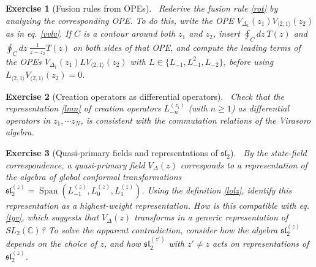 \documentclass[12pt, a4paper, notitlepage, twoside]{report}
\numberwithin{equation}{section}
\theoremstyle{break}
\newtheorem{exo}{Exercise}[chapter]
\begin{document}
\begin{exo}[Fusion rules from OPEs]
 ~\label{exooit}
Rederive the fusion rule \eqref{rot} by analyzing the corresponding OPE.
To do this, write the OPE $V_{\Delta_1}(z_1)V_{\langle 2,1 \rangle}(z_2)$ as in eq. \eqref{vvlv}.
If $C$ is a contour around both $z_1$ and $z_2$, insert $\oint_C dz\ T(z)$ and $\oint_C dz\ \frac{1}{z-z_2}T(z)$ on both sides of that OPE, and compute the leading terms of the OPEs $V_{\Delta_1}(z_1) LV_{\langle 2,1 \rangle}(z_2)$ with $L\in\{L_{-1},L_{-1}^2,L_{-2}\}$, before using $L_{\langle 2,1 \rangle} V_{\langle 2,1 \rangle} (z_2) =0$. 
\end{exo}

\begin{exo}[Creation operators as differential operators]
 ~\label{exodma}
 Check that the representation \eqref{lmn} of creation operators $L_{-n}^{(z_i)}$ (with $n\geq 1$) as differential operators in $z_1,\cdots z_N$, is consistent with the commutation relations of the Virasoro algebra. 
\end{exo}

\begin{exo}[Quasi-primary fields and representations of $\mathfrak{sl}_2$]
 ~\label{exoqp}
By the state-field correspondence, a quasi-primary field $V_\Delta(z)$ corresponds to a representation of the algebra of global conformal transformations $\mathfrak{sl}_2^{(z)} = \operatorname{Span}(L_{-1}^{(z)},L_0^{(z)},L_1^{(z)})$.
Using the definition \eqref{lolz}, identify this representation as a highest-weight representation.
How is this compatible with eq. \eqref{tgv}, which suggests that $V_\Delta(z)$ transforms in a generic representation of $SL_2({\mathbb{C}})$? To solve the apparent contradiction, consider how the algebra $\mathfrak{sl}_2^{(z)}$ depends on the choice of $z$, and how $\mathfrak{sl}_2^{(z')}$ with $z'\neq z$ acts on representations of $\mathfrak{sl}_2^{(z)}$.
\end{exo}
\end{document}
